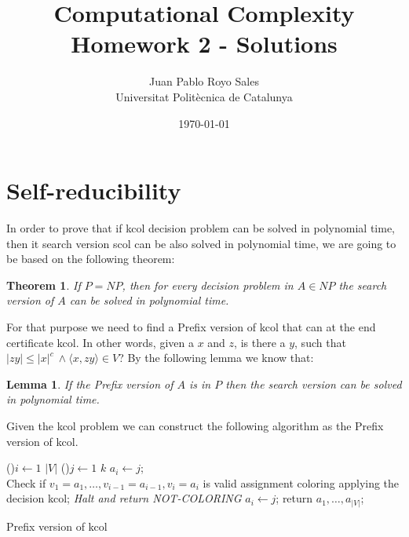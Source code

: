 \documentclass[12pt, a4paper]{article}
\title{%
  Computational Complexity \\
  Homework 2 - Solutions
}
\author{%
  Juan Pablo Royo Sales\\
  \small{Universitat Politècnica de Catalunya}
}
\date\today
\begin{document}
\maketitle

\section{Self-reducibility}\label{ex:1}

In order to prove that if \acrfull{kcol} decision problem can be solved in polynomial time, then it search version \acrfull{scol} can be also solved in polynomial time, we are going to be based on the following theorem:

\newtheorem{searchpnp}{Theorem}
\begin{searchpnp}
  If $P = NP$, then for every decision problem in $A \in NP$ the search version of $A$ can be solved in polynomial time.
\end{searchpnp}

For that purpose we need to find a Prefix version of \acrshort{kcol} that can at the end certificate \acrshort{kcol}\@. In other words, given a $x$ and $z$, is there a $y$, such that $|zy| \leq |x|^c\ \land \langle x,zy \rangle \in V$?
By the following lemma we know that:

\newtheorem{lemmasearch}{Lemma}
\begin{lemmasearch}
  If the Prefix version of $A$ is in $P$ then the search version can be solved in polynomial time.
\end{lemmasearch}

Given the \acrshort{kcol} problem we can construct the following algorithm as the Prefix version of \acrshort{kcol}.

\begin{algorithm}[H]
  \For(){$i \leftarrow 1$ \KwTo $|V|$}
  {\For(){$j \leftarrow 1$ \KwTo $k$}
    {$a_i \leftarrow j$; \\
      Check if $v_1 = a_1, \dots, v_{i-1} = a_{i-1}, v_i = a_i$ is valid assignment coloring applying the decision \acrshort{kcol};\label{polytime}
    }
    {\emph{Halt and return NOT-COLORING}
    }
    {$a_i \leftarrow j$; }
  }
  return $a_1,\dots,a_{|V|}$;
  \caption{Prefix version of \acrshort{kcol}}
\end{algorithm}
\end{document}
